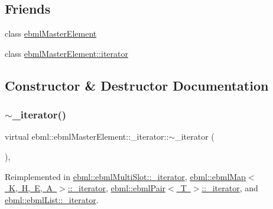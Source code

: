 \subsection*{Friends}
\begin{DoxyCompactItemize}
\item 
class \mbox{\hyperlink{classebml_1_1ebmlMasterElement_1_1__iterator_ad88e86cba72e9332a4693c1c6009b281}{ebml\+Master\+Element}}
\item 
class \mbox{\hyperlink{classebml_1_1ebmlMasterElement_1_1__iterator_a7f678a46134f738b99dfff4aafa7fc5f}{ebml\+Master\+Element\+::iterator}}
\end{DoxyCompactItemize}


\subsection{Constructor \& Destructor Documentation}
\mbox{\label{classebml_1_1ebmlMasterElement_1_1__iterator_a499f5fe9a5dddf51dd0ca181fc98f561}} 
\subsubsection{\texorpdfstring{$\sim$\+\_\+iterator()}{~\_iterator()}}
{\footnotesize\ttfamily virtual ebml\+::ebml\+Master\+Element\+::\+\_\+iterator\+::$\sim$\+\_\+iterator (\begin{DoxyParamCaption}{ }\end{DoxyParamCaption})\hspace{0.3cm}{\ttfamily [inline]}, {\ttfamily [virtual]}}



Reimplemented in \mbox{\hyperlink{classebml_1_1ebmlMultiSlot_1_1__iterator_a1d4b6ffee0d593ee22ac312d61d99d16}{ebml\+::ebml\+Multi\+Slot\+::\+\_\+iterator}}, \mbox{\hyperlink{classebml_1_1ebmlMap_1_1__iterator_a276c17f3a552f25f09735ffb6679fabd}{ebml\+::ebml\+Map$<$ K, H, E, A $>$\+::\+\_\+iterator}}, \mbox{\hyperlink{classebml_1_1ebmlPair_1_1__iterator_a03a93396a9ebfae5a550f76eeaed0fb5}{ebml\+::ebml\+Pair$<$ T $>$\+::\+\_\+iterator}}, and \mbox{\hyperlink{classebml_1_1ebmlList_1_1__iterator_ac9b20864cf56e1cf7767153ec53eefc0}{ebml\+::ebml\+List\+::\+\_\+iterator}}.



